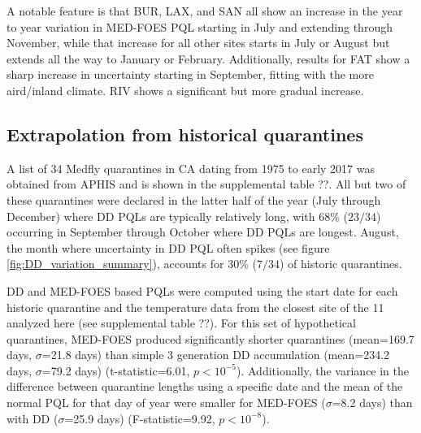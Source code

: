 \documentclass[10pt,a4paper,twocolumn]{article}
\begin{document}
A notable feature is that BUR, LAX, and SAN all show an increase in the year to year variation
in MED-FOES PQL starting in July and extending through November, 
while that increase for all other sites starts in July or August 
but extends all the way to January or February.
Additionally, results for FAT show a sharp increase in uncertainty starting in September, fitting with the 
more aird/inland climate.  RIV shows a significant but more gradual increase.

\subsection*{Extrapolation from historical quarantines}

A list of 34 Medfly quarantines in CA dating from 1975 to early 2017 was obtained from 
APHIS\cite{??} and is shown in the supplemental table ??.
All but two of these quarantines were declared in the latter half of the year
(July through December) where DD PQLs are typically relatively long,
with 68\% ($23/34$) occurring in September through October where DD PQLs are
longest. 
August, the month where uncertainty in DD PQL often spikes 
(see figure \ref{fig:DD_variation_summary}), 
accounts for 30\% ($7/34$) of historic quarantines.

DD and MED-FOES based PQLs were computed using the start date for each historic
quarantine and the temperature data from the closest site of the 11 analyzed
here (see supplemental table ??).
For this set of hypothetical quarantines, 
MED-FOES produced significantly shorter quarantines
(mean=169.7 days, $\sigma$=21.8 days)
than simple 3 generation DD accumulation
(mean=234.2 days, $\sigma$=79.2 days)
(t-statistic=6.01, $p<10^{-5}$).
Additionally, the variance in the difference between quarantine lengths
using a specific date and the mean of the normal PQL for that day of year
were smaller for MED-FOES ($\sigma$=8.2 days)
than with DD ($\sigma$=25.9 days)
(F-statistic=9.92, $p<10^{-8}$).
\end{document}

